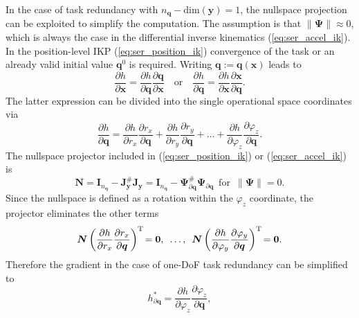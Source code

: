 \documentclass[a4paper,twoside]{article}
\newcommand{\transp}[0]{{\mathrm{T}}}
\begin{document}
In the case of task redundancy with $n_{\bm{q}}{-}\mathrm{dim}(\bm{y})=1$, the nullspace projection can be exploited to simplify the computation.
The assumption is that $\lVert\bm{\Psi}\rVert \approx 0$, which is always the case in the differential inverse kinematics (\ref{eq:ser_accel_ik}).
In the position-level IKP (\ref{eq:ser_position_ik}) convergence of the task or an already valid initial value $\bm{q}^{0}$ is required.
Writing $\bm{q}:=\bm{q}(\bm{x})$ leads to
\begin{equation}
\frac{\partial h}{\partial \bm{x}} = \frac{\partial h}{\partial \bm{q}} \frac{\partial \bm{q}}{\partial \bm{x}}
\quad \mathrm{or} \quad 
\frac{\partial h}{\partial \bm{q}} = \frac{\partial h}{\partial \bm{x}} \frac{\partial \bm{x}}{\partial \bm{q}}.
\label{eq:ser_gradient_opspace}
\end{equation}
The latter expression can be divided into the single operational space coordinates via
\begin{equation}
\frac{\partial h}{\partial \bm{q}} =
\frac{\partial h}{\partial r_x} \frac{\partial r_x}{\partial \bm{q}}
+
\frac{\partial h}{\partial r_y} \frac{\partial r_y}{\partial \bm{q}}
+ \hdots +
\frac{\partial h}{\partial \varphi_z} \frac{\partial \varphi_z}{\partial \bm{q}}.
\label{eq:ser_gradient_algebraic_conversion}
\end{equation}
The nullspace projector included in (\ref{eq:ser_position_ik}) or (\ref{eq:ser_accel_ik}) is
\begin{equation}
\bm{N}
= \bm{I}_{n_{\bm{q}}}-\bm{J}_{\bm{y}}^{\#}\bm{J}_{\bm{y}}
= \bm{I}_{n_{\bm{q}}}-\bm{\Psi}_{\partial \bm{q}}^{\#}\bm{\Psi}_{\partial \bm{q}}
\enspace \mathrm{for}\enspace \lVert\bm{\Psi}\rVert = 0.
\label{eq:ser_nullspace_projector}
\end{equation}
Since the nullspace is defined as a rotation within the $\varphi_z$ coordinate, the projector eliminates the other terms
\begin{equation}
\bm{N}\left(\frac{\partial h}{\partial r_x} \frac{\partial r_x}{\partial \bm{q}}\right)^\transp \hspace{-0.5mm}=\bm{0}, %
\enskip \hdots, \enskip
\bm{N}\left(\frac{\partial h}{\partial \varphi_y} \frac{\partial \varphi_y}{\partial \bm{q}}\right)^\transp \hspace{-0.5mm}=\bm{0}.
\label{eq:serrob_nullspace_elim}
\end{equation}
Therefore the gradient in the case of one-DoF task redundancy can be simplified to
\begin{equation}
h_{\partial \bm{q}}^{*} 
= 
\frac{\partial h}{\partial \varphi_z} \frac{\partial \varphi_z}{\partial \bm{q}},
\label{eq:serrob_nullspace_phiz}
\end{equation}
\end{document}
